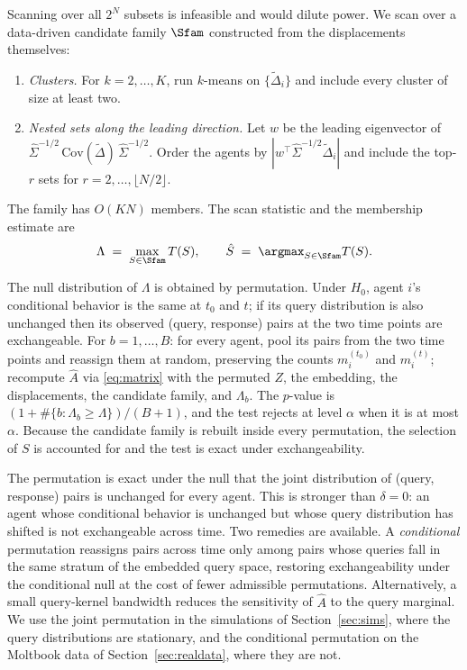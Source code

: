 Scanning over all $2^N$ subsets is infeasible and would dilute power. We scan over a data-driven candidate family $\Sfam$ constructed from the displacements themselves:
\begin{enumerate}
  \item \emph{Clusters.} For $k=2,\dots,K$, run $k$-means on $\{\tilde\Delta_i\}$ and include every cluster of size at least two.
  \item \emph{Nested sets along the leading direction.} Let $w$ be the leading eigenvector of $\hat\Sigma^{-1/2}\,\mathrm{Cov}(\tilde\Delta)\,\hat\Sigma^{-1/2}$. Order the agents by $|w^\top\hat\Sigma^{-1/2}\tilde\Delta_i|$ and include the top-$r$ sets for $r=2,\dots,\lfloor N/2\rfloor$.
\end{enumerate}
The family has $O(KN)$ members. The scan statistic and the membership estimate are
\begin{equation}
\label{eq:scan}
\Lambda \;=\; \max_{S\in\Sfam} T(S), \qquad \hat S \;=\; \argmax_{S\in\Sfam} T(S).
\end{equation}

The null distribution of $\Lambda$ is obtained by permutation. Under $H_0$, agent $i$'s conditional behavior is the same at $t_0$ and $t$; if its query distribution is also unchanged then its observed (query, response) pairs at the two time points are exchangeable. For $b=1,\dots,B$: for every agent, pool its pairs from the two time points and reassign them at random, preserving the counts $m_i^{(t_0)}$ and $m_i^{(t)}$; recompute $\hat A$ via \eqref{eq:matrix} with the permuted $Z$, the embedding, the displacements, the candidate family, and $\Lambda_b$. The $p$-value is $(1+\#\{b:\Lambda_b\ge\Lambda\})/(B+1)$, and the test rejects at level $\alpha$ when it is at most $\alpha$. Because the candidate family is rebuilt inside every permutation, the selection of $S$ is accounted for and the test is exact under exchangeability.

\begin{remark}
The permutation is exact under the null that the joint distribution of (query, response) pairs is unchanged for every agent. This is stronger than $\delta=0$: an agent whose conditional behavior is unchanged but whose query distribution has shifted is not exchangeable across time. Two remedies are available. A \emph{conditional} permutation reassigns pairs across time only among pairs whose queries fall in the same stratum of the embedded query space, restoring exchangeability under the conditional null at the cost of fewer admissible permutations. Alternatively, a small query-kernel bandwidth reduces the sensitivity of $\hat A$ to the query marginal. We use the joint permutation in the simulations of Section~\ref{sec:sims}, where the query distributions are stationary, and the conditional permutation on the Moltbook data of Section~\ref{sec:realdata}, where they are not.
\end{remark}

